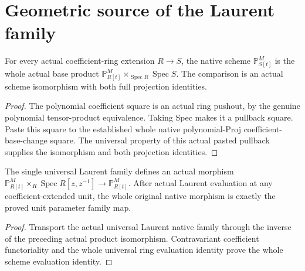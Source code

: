 \section{Geometric source of the Laurent family}

\begin{lemma}
\label{lem:native-parameter-family-product}
\leanok
For every actual coefficient-ring extension $R\to S$, the native scheme
$\mathbb P^M_{S[t]}$ is the whole actual base product
$\mathbb P^M_{R[t]}\times_{\operatorname{Spec}R}\operatorname{Spec}S$.
The comparison is an actual scheme isomorphism with both full projection
identities.
\end{lemma}
\begin{proof}
The polynomial coefficient square is an actual ring pushout, by the
genuine polynomial tensor-product equivalence.  Taking Spec makes it
a pullback square.  Paste this square to the established
whole native polynomial-Proj coefficient-base-change square.  The
universal property of this actual pasted pullback supplies the
isomorphism and both projection identities.
\end{proof}

\begin{lemma}
\label{lem:native-laurent-action-morphism}
\leanok
The single universal Laurent family defines an actual morphism
$\mathbb P^M_{R[t]}\times_R\operatorname{Spec}R[z,z^{-1}]
\to\mathbb P^M_{R[t]}$.
After actual Laurent evaluation at any coefficient-extended unit, the
whole original native morphism is exactly the proved unit parameter
family map.
\end{lemma}
\begin{proof}
Transport the actual universal Laurent native family through the inverse
of the preceding actual product isomorphism.  Contravariant coefficient
functoriality and the whole universal ring evaluation identity prove the
whole scheme evaluation identity.
\end{proof}

